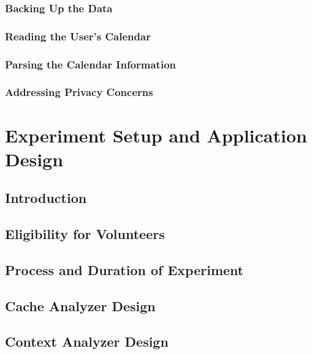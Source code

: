 \documentclass[12pt]{uthesis-v12}  %
\begin{document}
		\subsection{Backing Up the Data}
		\subsection{Reading the User's Calendar}
		\subsection{Parsing the Calendar Information}
		\subsection{Addressing Privacy Concerns}
\chapter{Experiment Setup and Application Design}
	
	\section{Introduction}
		
	\section{Eligibility for Volunteers}
	
	\section{Process and Duration of Experiment}
	
	\section{Cache Analyzer Design}
	
	\section{Context Analyzer Design}
	
\end{document}
